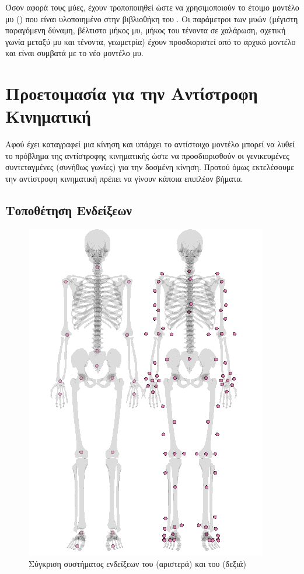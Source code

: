 Όσον αφορά τους μύες, έχουν τροποποιηθεί ώστε να χρησιμοποιούν το έτοιμο μοντέλο μυ () που είναι υλοποιημένο στην βιβλιοθήκη του . Οι παράμετροι των μυών (μέγιστη παραγόμενη δύναμη, βέλτιστο μήκος μυ, μήκος του τένοντα σε χαλάρωση, σχετική γωνία μεταξύ μυ και τένοντα, γεωμετρία) έχουν προσδιοριστεί από το αρχικό μοντέλο και είναι συμβατά με το νέο μοντέλο μυ.

\section{Προετοιμασία για την Αντίστροφη Κινηματική}

Αφού έχει καταγραφεί μια κίνηση και υπάρχει το αντίστοιχο μοντέλο μπορεί να λυθεί το πρόβλημα της αντίστροφης κινηματικής ώστε να προσδιορισθούν οι γενικευμένες συντεταγμένες (συνήθως γωνίες) για την δοσμένη κίνηση. Προτού όμως εκτελέσουμε την αντίστροφη κινηματική πρέπει να γίνουν κάποια επιπλέον βήματα.

\subsection{Τοποθέτηση Ενδείξεων}

\begin{figure}[H]
    \centering
    \includegraphics[height=0.6\textheight, keepaspectratio]{fig/kinect-vicon-markers.png}
    \caption{Σύγκριση συστήματος ενδείξεων του  (αριστερά) και του  (δεξιά)}
    \label{fig:kinect-vicon-markers}
\end{figure}

